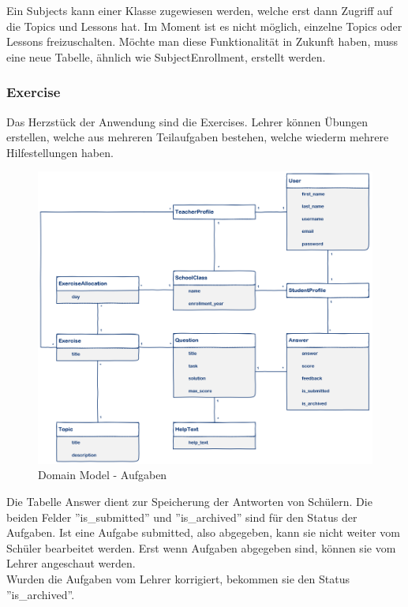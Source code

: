 Ein Subjects kann einer Klasse zugewiesen werden, welche erst dann Zugriff auf die Topics und Lessons hat. Im Moment ist es nicht möglich, einzelne Topics oder Lessons freizuschalten. Möchte man diese Funktionalität in Zukunft haben, muss eine neue Tabelle, ähnlich wie SubjectEnrollment, erstellt werden.

\newpage
\subsubsection*{Exercise}
Das Herzstück der Anwendung sind die Exercises. Lehrer können Übungen erstellen, welche aus mehreren Teilaufgaben bestehen, welche wiederm mehrere Hilfestellungen haben. 

\begin{figure}[H]
\begin{center}
	\includegraphics[width=\textwidth, keepaspectratio]{images/domain_model_exercise.png}
	\caption{Domain Model - Aufgaben}
	\label{fig:domain_model_exercise}
\end{center}
\end{figure}

Die Tabelle Answer dient zur Speicherung der Antworten von Schülern. Die beiden Felder ''is\_submitted'' und ''is\_archived'' sind für den Status der Aufgaben. Ist eine Aufgabe submitted, also abgegeben, kann sie nicht weiter vom Schüler bearbeitet werden. Erst wenn Aufgaben abgegeben sind, können sie vom Lehrer angeschaut werden. \\ 
Wurden die Aufgaben vom Lehrer korrigiert, bekommen sie den Status ''is\_archived''.

